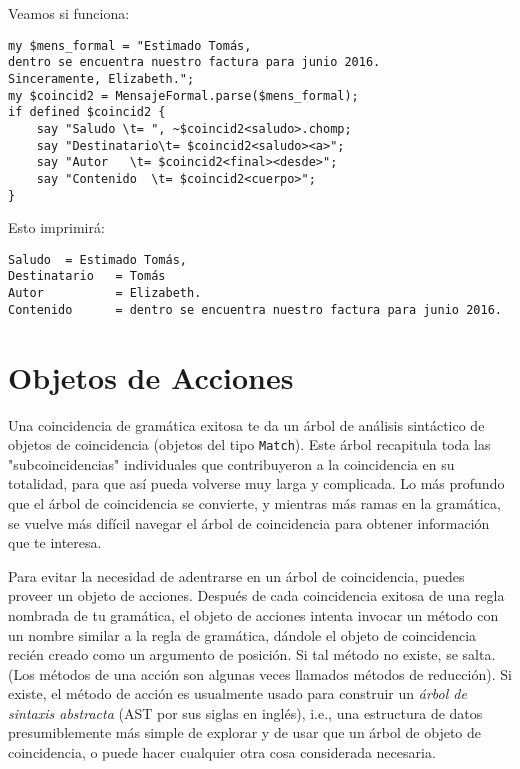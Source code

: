 Veamos si funciona:

\begin{verbatim}
my $mens_formal = "Estimado Tomás,
dentro se encuentra nuestro factura para junio 2016.
Sinceramente, Elizabeth.";
my $coincid2 = MensajeFormal.parse($mens_formal);
if defined $coincid2 { 
    say "Saludo \t= ", ~$coincid2<saludo>.chomp;
    say "Destinatario\t= $coincid2<saludo><a>";
    say "Autor   \t= $coincid2<final><desde>";
    say "Contenido  \t= $coincid2<cuerpo>";
}
\end{verbatim}

Esto imprimirá:

\begin{verbatim}
Saludo 	= Estimado Tomás,
Destinatario   = Tomás
Autor          = Elizabeth.
Contenido      = dentro se encuentra nuestro factura para junio 2016.
\end{verbatim}

\section{Objetos de Acciones}

\label{actions_object}

Una coincidencia de gramática exitosa te da un árbol de análisis
sintáctico de objetos de coincidencia (objetos del tipo \verb|Match|).
Este árbol recapitula toda las "subcoincidencias" individuales que
contribuyeron a la coincidencia en su totalidad, para que
así pueda volverse muy larga y complicada. Lo más profundo
que el árbol de coincidencia se convierte, y mientras más ramas en 
la gramática, se vuelve más difícil navegar el árbol de 
coincidencia para obtener información que te interesa.

Para evitar la necesidad de adentrarse en un árbol de coincidencia,
puedes proveer un objeto de acciones. Después de cada coincidencia
exitosa de una regla nombrada de tu gramática, el objeto de acciones
intenta invocar un método con un nombre similar a la regla de gramática,
dándole el objeto de coincidencia recién creado como un argumento de posición.
Si tal método no existe, se salta. (Los métodos de una acción son 
algunas veces llamados métodos de reducción). Si existe, 
el método de acción es usualmente usado para construir 
un \emph{árbol de sintaxis abstracta} (AST por sus siglas en inglés),
i.e., una estructura de datos presumiblemente más simple de 
explorar y de usar que un árbol de objeto de coincidencia, 
o puede hacer cualquier otra cosa considerada necesaria.

